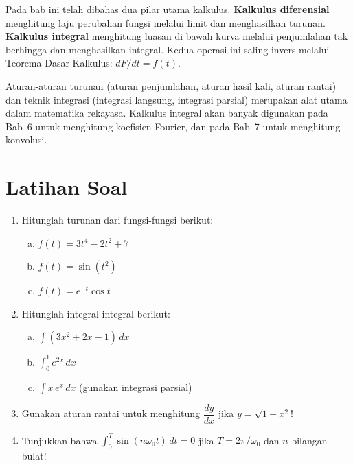 Pada bab ini telah dibahas dua pilar utama kalkulus. \textbf{Kalkulus diferensial} menghitung laju perubahan fungsi melalui limit dan menghasilkan turunan. \textbf{Kalkulus integral} menghitung luasan di bawah kurva melalui penjumlahan tak berhingga dan menghasilkan integral. Kedua operasi ini saling invers melalui Teorema Dasar Kalkulus: $dF/dt = f(t)$.

Aturan-aturan turunan (aturan penjumlahan, aturan hasil kali, aturan rantai) dan teknik integrasi (integrasi langsung, integrasi parsial) merupakan alat utama dalam matematika rekayasa. Kalkulus integral akan banyak digunakan pada Bab~6 untuk menghitung koefisien Fourier, dan pada Bab~7 untuk menghitung konvolusi.

\section*{Latihan Soal}

\begin{enumerate}
  \item Hitunglah turunan dari fungsi-fungsi berikut:
  \begin{enumerate}[(a)]
    \item $f(t) = 3t^4 - 2t^2 + 7$
    \item $f(t) = \sin(t^2)$
    \item $f(t) = e^{-t}\cos t$
  \end{enumerate}
  \item Hitunglah integral-integral berikut:
  \begin{enumerate}[(a)]
    \item $\displaystyle\int (3x^2 + 2x - 1)\,dx$
    \item $\displaystyle\int_0^1 e^{2x}\,dx$
    \item $\displaystyle\int x\,e^x\,dx$ \quad (gunakan integrasi parsial)
  \end{enumerate}
  \item Gunakan aturan rantai untuk menghitung $\dfrac{dy}{dx}$ jika $y = \sqrt{1 + x^2}$!
  \item Tunjukkan bahwa $\displaystyle\int_0^T \sin(n\omega_0 t)\,dt = 0$ jika $T = 2\pi/\omega_0$ dan $n$ bilangan bulat!
\end{enumerate}



